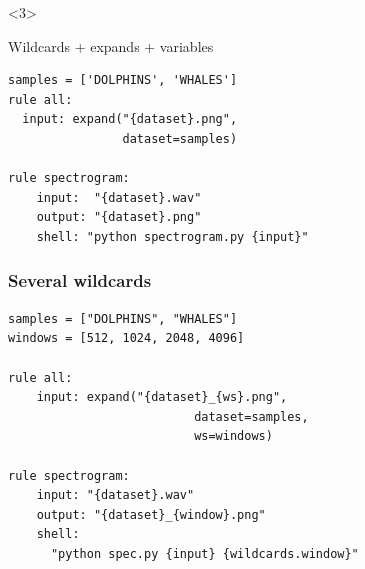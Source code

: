 \documentclass{beamer}
\begin{document}
\begin{frame}[fragile]
\begin{center}
\begin{minipage}{11cm}
         
    \begin{onlyenv}<3>  
        \begin{block}{Wildcards + expands + variables}
            \begin{lstlisting}[basicstyle=\large] 
samples = ['DOLPHINS', 'WHALES']            
rule all:
  input: expand("{dataset}.png", 
                dataset=samples)

rule spectrogram:
    input:  "{dataset}.wav"
    output: "{dataset}.png"
    shell: "python spectrogram.py {input}"
           \end{lstlisting}     
  \end{block}
     \end{onlyenv}        
    \end{minipage}
 \end{center}
 
\end{frame}
        
      
\begin{frame}[fragile]
\frametitle{Several wildcards}
   \begin{minipage}{12cm}
  \begin{block}{}
            \begin{lstlisting}[basicstyle=\large]
samples = ["DOLPHINS", "WHALES"]
windows = [512, 1024, 2048, 4096]

rule all:
    input: expand("{dataset}_{ws}.png", 
                          dataset=samples, 
                          ws=windows)

rule spectrogram:
    input: "{dataset}.wav"
    output: "{dataset}_{window}.png"
    shell: 
      "python spec.py {input} {wildcards.window}"
            \end{lstlisting}
  \end{block}
\end{minipage}
\end{frame}
  
        
\end{document}

